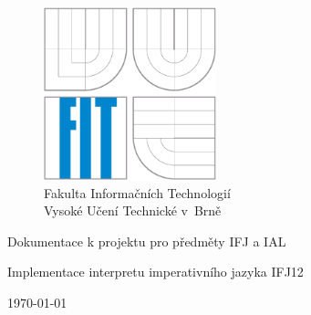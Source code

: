 \begin{titlepage}

\begin{figure}[!h]
  \centering
  \includegraphics[height=5cm]{img/logo.eps} \\
  Fakulta Informačních Technologií \\
  Vysoké Učení Technické v~Brně
\end{figure}

\vfill

\begin{center}
\begin{Large}
Dokumentace k projektu pro předměty IFJ a IAL\\
\end{Large}
\bigskip
\begin{Huge}
Implementace interpretu imperativního jazyka IFJ12\\
\end{Huge}
\end{center}

\vfill

\begin{center}
\begin{Large}
\today
\end{Large}
\end{center}

\vfill


\end{titlepage}
